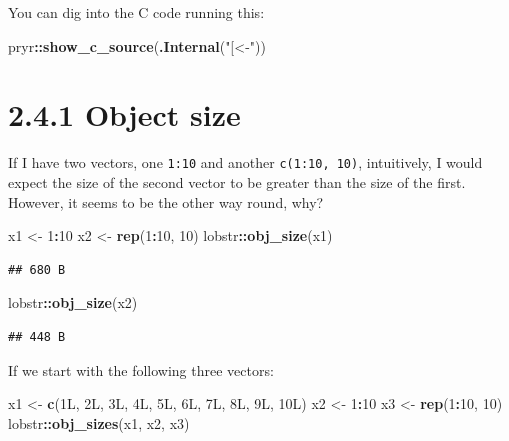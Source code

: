\documentclass[]{book}
\newenvironment{Shaded}{\begin{snugshade}}{\end{snugshade}}
\newcommand{\DecValTok}[1]{\textcolor[rgb]{0.00,0.00,0.81}{#1}}
\newcommand{\KeywordTok}[1]{\textcolor[rgb]{0.13,0.29,0.53}{\textbf{#1}}}
\newcommand{\NormalTok}[1]{#1}
\newcommand{\OperatorTok}[1]{\textcolor[rgb]{0.81,0.36,0.00}{\textbf{#1}}}
\newcommand{\StringTok}[1]{\textcolor[rgb]{0.31,0.60,0.02}{#1}}
\begin{document}
You can dig into the C code running this:

\begin{Shaded}
\begin{Highlighting}[]
\NormalTok{pryr}\OperatorTok{::}\KeywordTok{show_c_source}\NormalTok{(}\KeywordTok{.Internal}\NormalTok{(}\StringTok{"[<-"}\NormalTok{))}
\end{Highlighting}
\end{Shaded}

\hypertarget{object-size}{%
\section*{2.4.1 Object size}\label{object-size}}

If I have two vectors, one \texttt{1:10} and another \texttt{c(1:10,\ 10)}, intuitively, I would expect the size of the second vector to be greater than the size of the first. However, it seems to be the other way round, why?

\begin{Shaded}
\begin{Highlighting}[]
\NormalTok{x1 <-}\StringTok{ }\DecValTok{1}\OperatorTok{:}\DecValTok{10}
\NormalTok{x2 <-}\StringTok{ }\KeywordTok{rep}\NormalTok{(}\DecValTok{1}\OperatorTok{:}\DecValTok{10}\NormalTok{, }\DecValTok{10}\NormalTok{)}
\NormalTok{lobstr}\OperatorTok{::}\KeywordTok{obj_size}\NormalTok{(x1)}
\end{Highlighting}
\end{Shaded}

\begin{verbatim}
## 680 B
\end{verbatim}

\begin{Shaded}
\begin{Highlighting}[]
\NormalTok{lobstr}\OperatorTok{::}\KeywordTok{obj_size}\NormalTok{(x2)}
\end{Highlighting}
\end{Shaded}

\begin{verbatim}
## 448 B
\end{verbatim}

If we start with the following three vectors:

\begin{Shaded}
\begin{Highlighting}[]
\NormalTok{x1 <-}\StringTok{ }\KeywordTok{c}\NormalTok{(1L, 2L, 3L, 4L, 5L, 6L, 7L, 8L, 9L, 10L)}
\NormalTok{x2 <-}\StringTok{ }\DecValTok{1}\OperatorTok{:}\DecValTok{10}
\NormalTok{x3 <-}\StringTok{ }\KeywordTok{rep}\NormalTok{(}\DecValTok{1}\OperatorTok{:}\DecValTok{10}\NormalTok{, }\DecValTok{10}\NormalTok{)}
\NormalTok{lobstr}\OperatorTok{::}\KeywordTok{obj_sizes}\NormalTok{(x1, x2, x3)}
\end{Highlighting}
\end{Shaded}
\end{document}
